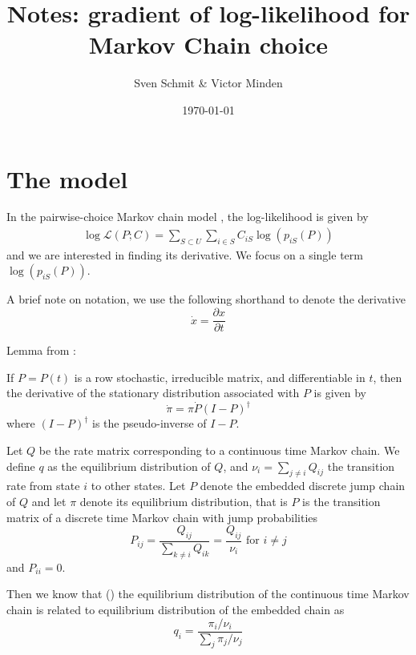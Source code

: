 \title{Notes: gradient of log-likelihood for Markov Chain choice}
\author{Sven Schmit \& Victor Minden}
\date{\today}



    \maketitle
    \section{The model}
    In the pairwise-choice Markov chain model \cite{pcmc}, the log-likelihood is given by
    \begin{align*}
        \log \mathcal{L}(P; C) = \sum_{S \subset U} \sum_{i \in S} C_{iS} \log(p_{iS}(P))
    \end{align*}
	and we are interested in finding its derivative.
	We focus on a single term $\log(p_{iS}(P))$.



	A brief note on notation, we use the following shorthand to denote the derivative
	\[
		\dot x = \frac{\partial x}{\partial t}
	\]

    Lemma from \cite[Theorem 3.2]{golub}:
    \begin{lemma}
        If $P = P(t)$ is a row stochastic, irreducible matrix, and differentiable in $t$, then
        the derivative of the stationary distribution associated with $P$ is given by
        \[
			\dot \pi = \pi \dot P (I - P)^\dagger
        \]
        where $(I - P)^\dagger$ is the pseudo-inverse of $I - P$.
    \end{lemma}

    Let $Q$ be the rate matrix corresponding to a continuous time Markov chain.
    We define $q$ as the equilibrium distribution of $Q$,
	and $\nu_i = \sum_{j \ne i} Q_{ij}$ the transition rate from state $i$ to other states.
    Let $P$ denote the embedded discrete jump chain of $Q$ and let $\pi$ denote its equilibrium distribution,
    that is $P$ is the transition matrix of a discrete time Markov chain with jump probabilities
    \[
        P_{ij} = \frac{Q_{ij}}{\sum_{k\ne i} Q_{ik}} = \frac{Q_{ij}}{\nu_i} \text{ for } i \ne j
    \]
	and $P_{ii} = 0$.

    Then we know that (\cite[page 398]{ross}) the equilibrium distribution of the continuous time
	Markov chain is related to equilibrium distribution of the embedded chain as
    \[
        q_i = \frac{\pi_i / \nu_i}{\sum_j \pi_j / \nu_j}
    \]


